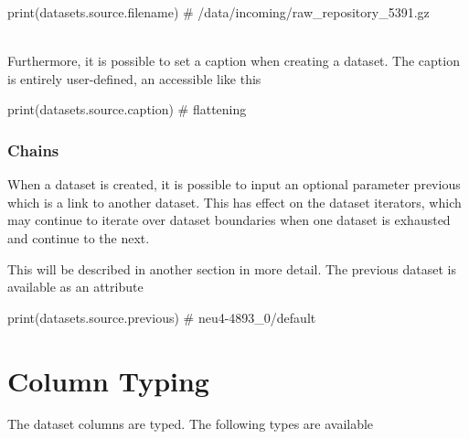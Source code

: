 \begin{python}
print(datasets.source.filename)
# /data/incoming/raw_repository_5391.gz
\end{python}
\\
Furthermore, it is possible to set a caption when creating a dataset.
The caption is entirely user-defined, an accessible like this

\begin{python}
print(datasets.source.caption)
# flattening
\end{python}



\subsubsection{Chains}

When a dataset is created, it is possible to input an optional
parameter previous which is a link to another dataset.  This has
effect on the dataset iterators, which may continue to iterate over
dataset boundaries when one dataset is exhausted and continue to the
next.

This will be described in another section in more detail.  The
previous dataset is available as an attribute

\begin{python}
print(datasets.source.previous)
# neu4-4893_0/default
\end{python}



\newpage
\section{Column Typing}
The dataset columns are typed.  The following types are available

